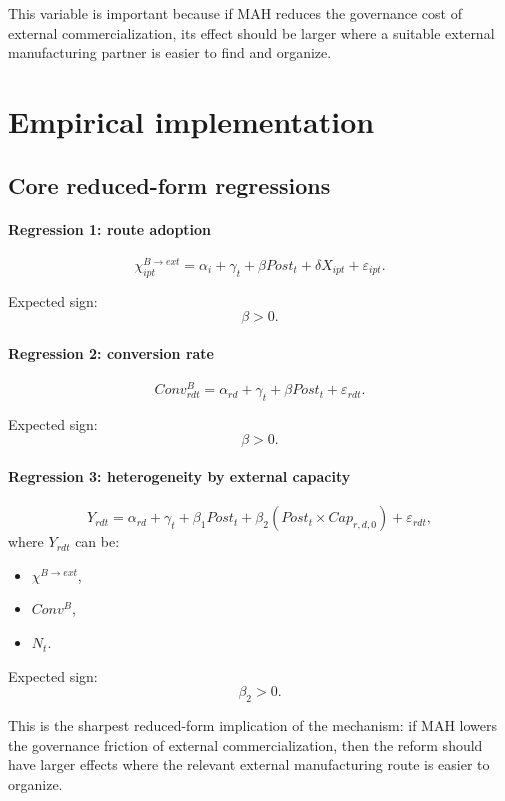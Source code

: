 \documentclass[12pt]{article}
\begin{document}
This variable is important because if MAH reduces the governance cost of external commercialization,
its effect should be larger where a suitable external manufacturing partner is easier to find and organize.

\section{Empirical implementation}

\subsection{Core reduced-form regressions}

\paragraph{Regression 1: route adoption}
\[
\chi^{B\to ext}_{ipt}
=
\alpha_i+\gamma_t+\beta Post_t+\delta X_{ipt}+\varepsilon_{ipt}.
\]

Expected sign:
\[
\beta>0.
\]

\paragraph{Regression 2: conversion rate}
\[
Conv^B_{rdt}
=
\alpha_{rd}+\gamma_t+\beta Post_t+\varepsilon_{rdt}.
\]

Expected sign:
\[
\beta>0.
\]

\paragraph{Regression 3: heterogeneity by external capacity}
\[
Y_{rdt}
=
\alpha_{rd}
+
\gamma_t
+
\beta_1 Post_t
+
\beta_2(Post_t\times Cap_{r,d,0})
+
\varepsilon_{rdt},
\]
where \(Y_{rdt}\) can be:
\begin{itemize}[leftmargin=2em]
    \item \(\chi^{B\to ext}\),
    \item \(Conv^B\),
    \item \(N_t\).
\end{itemize}

Expected sign:
\[
\beta_2>0.
\]

This is the sharpest reduced-form implication of the mechanism:
if MAH lowers the governance friction of external commercialization, then the reform should
have larger effects where the relevant external manufacturing route is easier to organize.
\end{document}

